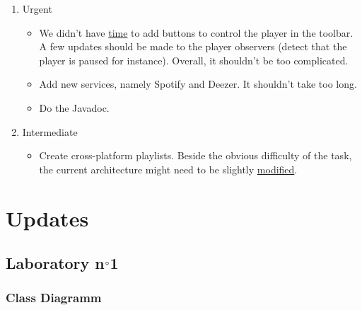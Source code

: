 \documentclass{report}
\begin{document}
\begin{enumerate}
\item Urgent 
\begin{itemize}
\label{lim::toolbar}
\item We didn't have \hyperref[implem::long]{time} to add buttons to control the player in the toolbar. A few updates should be made to the player observers (detect that the player is paused for instance). Overall, it shouldn't be too complicated.
\item Add new services, namely Spotify and Deezer. It shouldn't take too long.
\item Do the Javadoc.
\end{itemize}
\item Intermediate
\begin{itemize}
\item Create cross-platform playlists. Beside the obvious difficulty of the task, the current architecture might need to be slightly \hyperlink{db}{modified}.
\end{itemize}
\end{enumerate}


\chapter{Updates}

\section{Laboratory n$\degree$1}

\subsection{Class Diagramm}
\end{document}
